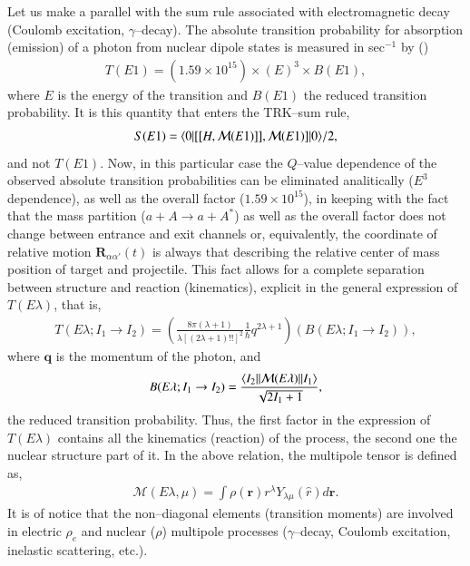 Let us make a parallel with the sum rule associated with electromagnetic decay (Coulomb excitation, $\gamma$--decay). The absolute transition probability for absorption (emission) of a photon from nuclear dipole states is measured in sec$^{-1}$ by (\cite{Bohr:69})
\begin{align}
T(E1)=\left(1.59\times 10^{15}\right)\times (E)^3\times B(E1),
\end{align}
where $E$ is the energy of the transition and $B(E1)$ the reduced transition probability. It is this quantity that enters the TRK--sum rule,
\begin{align}
S(E1)=\langle {0}|[[H,\mathcal M(E1)]],\mathcal M(E1)]|{0} \rangle/2,
\end{align}
 and not $T(E1)$. Now, in this particular case the $Q$--value dependence of the observed absolute transition probabilities can be eliminated analitically ($E^3$ dependence), as well as the overall factor  ($1.59\times 10^{15}$), in keeping with the fact that the mass partition ($a+A\rightarrow a+A^*$) as well as the overall factor does not change between entrance and exit channels or, equivalently, the coordinate of relative motion $\mathbf R_{\alpha\alpha'}(t)$ is always that describing the relative center of mass position of target and projectile. This fact allows for a complete separation between structure and reaction (kinematics), explicit in the general expression of $T(E\lambda)$, that is,
 \begin{align}
 T(E\lambda;I_1\rightarrow I_2)=\left(\frac{8\pi(\lambda+1)}{\lambda[(2\lambda+1)!!]^2}\frac{1}{\hbar}q^{2\lambda+1}\right)\left(B(E\lambda;I_1\rightarrow I_2)\right),
 \end{align}
where $\mathbf q$ is the momentum of the photon, and 
 \begin{align}
B(E\lambda;I_1\rightarrow I_2)=\frac{\langle {I_2||\mathcal M(E\lambda)||I_1} \rangle}{\sqrt{2I_1+1}},
 \end{align}
 the reduced transition probability. Thus, the first factor in the expression of $T(E\lambda)$ contains all the kinematics (reaction) of the process, the second  one the nuclear structure part of it. In the above relation, the multipole tensor is defined as,
 \begin{align}
\mathcal M(E\lambda,\mu)=\int \rho(\mathbf r)r^\lambda Y_{\lambda\mu}(\hat r)d \mathbf r.
 \end{align}
It is of notice that the non--diagonal elements (transition moments) are involved in electric $\rho_e$ and nuclear ($\rho$) multipole processes ($\gamma$--decay, Coulomb excitation, inelastic scattering, etc.).



